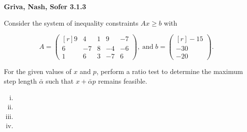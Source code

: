 \textbf{Griva, Nash, Sofer 3.1.3}

Consider the system of inequality constraints $Ax \ge b$ with

$$
  A = \begin{pmatrix*}[r]
    9 &  4 & 1 &  9 & -7 \\
    6 & -7 & 8 & -4 & -6 \\
    1 &  6 & 3 & -7 &  6
  \end{pmatrix*},\; \text{and}\; 
  b = \begin{pmatrix*}[r]
    -15 \\
    -30 \\
    -20
  \end{pmatrix*}.
$$

For the given values of $x$ and $p$, perform a ratio test to determine the maximum step length $\bar{\alpha}$ such that
$x + \bar{\alpha} p$ remains feasible.

\begin{enumerate}[(i)]
  \item 
  \item 
  \item 
  \item 
\end{enumerate}